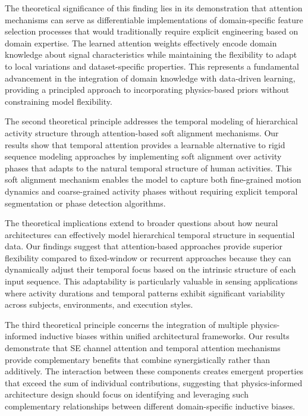 \documentclass[journal]{IEEEtran}
\begin{document}
The theoretical significance of this finding lies in its demonstration that attention mechanisms can serve as differentiable implementations of domain-specific feature selection processes that would traditionally require explicit engineering based on domain expertise. The learned attention weights effectively encode domain knowledge about signal characteristics while maintaining the flexibility to adapt to local variations and dataset-specific properties. This represents a fundamental advancement in the integration of domain knowledge with data-driven learning, providing a principled approach to incorporating physics-based priors without constraining model flexibility.

The second theoretical principle addresses the temporal modeling of hierarchical activity structure through attention-based soft alignment mechanisms. Our results show that temporal attention provides a learnable alternative to rigid sequence modeling approaches by implementing soft alignment over activity phases that adapts to the natural temporal structure of human activities. This soft alignment mechanism enables the model to capture both fine-grained motion dynamics and coarse-grained activity phases without requiring explicit temporal segmentation or phase detection algorithms.

The theoretical implications extend to broader questions about how neural architectures can effectively model hierarchical temporal structure in sequential data. Our findings suggest that attention-based approaches provide superior flexibility compared to fixed-window or recurrent approaches because they can dynamically adjust their temporal focus based on the intrinsic structure of each input sequence. This adaptability is particularly valuable in sensing applications where activity durations and temporal patterns exhibit significant variability across subjects, environments, and execution styles.

The third theoretical principle concerns the integration of multiple physics-informed inductive biases within unified architectural frameworks. Our results demonstrate that SE channel attention and temporal attention mechanisms provide complementary benefits that combine synergistically rather than additively. The interaction between these components creates emergent properties that exceed the sum of individual contributions, suggesting that physics-informed architecture design should focus on identifying and leveraging such complementary relationships between different domain-specific inductive biases.
\end{document}
